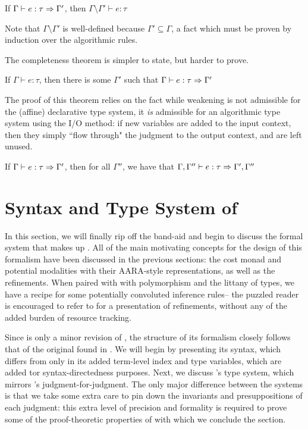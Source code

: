 \begin{theorem}
If $\Gamma \vdash e : \tau \Rightarrow \Gamma'$, then $\Gamma \setminus \Gamma' \vdash e : \tau$
\end{theorem}

Note that $\Gamma \setminus \Gamma'$ is well-defined because $\Gamma' \subseteq \Gamma$, a fact which must be proven by induction over the algorithmic rules.

The completeness theorem is simpler to state, but harder to prove.

\begin{theorem}
If $\Gamma \vdash e : \tau$, then there is some $\Gamma'$ such that $\Gamma \vdash e : \tau \Rightarrow \Gamma'$
\end{theorem}

The proof of this theorem relies on the fact while weakening is not admissible for the (affine) declarative type system, it \textit{is} admissible for an algorithmic type system using the I/O method: if new variables are added to the input context, then they simply ``flow through" the judgment to the output context, and are left unused.

\begin{theorem}
If $\Gamma \vdash e : \tau \Rightarrow \Gamma'$, then for all $\Gamma''$, we have that $\Gamma,\Gamma'' \vdash e : \tau \Rightarrow \Gamma',\Gamma''$
\end{theorem}

\section{Syntax and Type System of \dlambdaamor}
\label{sec:dlambdaamor-syntax-and-types}

In this section, we will finally rip off the band-aid and begin to discuss the formal system that makes up \dlambdaamor. All of the main motivating concepts for the design of this formalism have been discussed in the previous sections: the cost monad and potential modalities with their AARA-style representations, as well as the refinements. When paired with with polymorphism and the littany of types, we have a recipe for some potentially convoluted inference rules-- the puzzled reader is encouraged to refer to \citet{xi:jfp07} for a presentation of refinements, without any of the added burden of resource tracking.

Since \dlambdaamor is only a minor revision of \lambdaamor, the structure of its formalism closely follows that of the original found in \citet{rajani-et-al:popl20}. 
We will begin by presenting its syntax, which differs from \lambdaamor only in its added term-level index and type variables, which are added tor syntax-directedness purposes. Next, we discuss \dlambdaamor's type system, which mirrors \lambdaamor's judgment-for-judgment. The only major difference between the systems is that we take some extra care to pin down the invariants and presuppositions of each judgment: this extra level of precision and formality is required to prove some of the proof-theoretic properties of \dlambdaamor with which we conclude the section.

